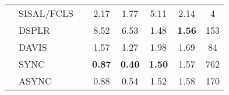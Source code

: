 \begin{table}[t!]
\begin{center}
{\begin{tabular}{@{}lllccccc@{}}
&SISAL/FCLS	&\cite{Bioucas2009}   & 2.17 & 1.77 & 5.11 & 2.14 & 4   \\
&DSPLR &\cite{Tsinos2017} &	8.52 &	6.53 &	1.48 &	\textbf{1.56} &	153 \\
& DAVIS &\cite{Davis2016} &	1.57 &	1.27 &	1.98 &	1.69 &	84 \\ 
&SYNC &	&\textbf{0.87} &	\textbf{0.40} &	\textbf{1.50} &	1.57 &	762 \\
&ASYNC &	&0.88 &	0.54 &	1.52 &	1.58 &	170 \\
\bottomrule
		\end{tabular}
}
	\end{center}
\label{tab:results_synth}
\end{table}


